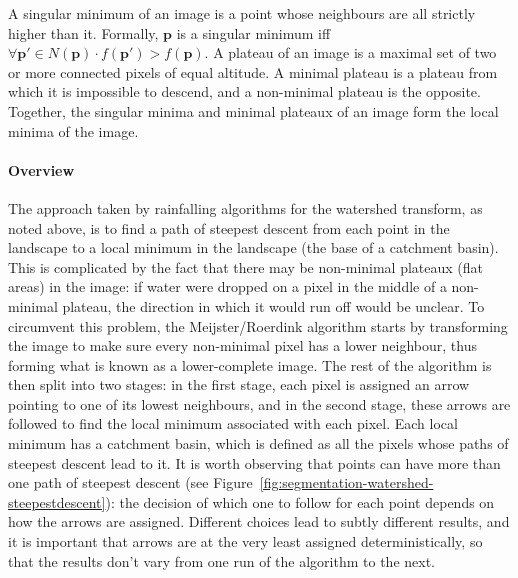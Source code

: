 
A singular minimum of an image is a point whose neighbours are all strictly higher than it. Formally, $\mathbf{p}$ is a singular minimum iff $\forall \mathbf{p'} \in N(\mathbf{p}) \cdot f(\mathbf{p'}) > f(\mathbf{p})$. A plateau of an image is a maximal set of two or more connected pixels of equal altitude. A minimal plateau is a plateau from which it is impossible to descend, and a non-minimal plateau is the opposite. Together, the singular minima and minimal plateaux of an image form the local minima of the image.

\paragraph{Overview} The approach taken by rainfalling algorithms for the watershed transform, as noted above, is to find a path of steepest descent from each point in the landscape to a local minimum in the landscape (the base of a catchment basin). This is complicated by the fact that there may be non-minimal plateaux (flat areas) in the image: if water were dropped on a pixel in the middle of a non-minimal plateau, the direction in which it would run off would be unclear. To circumvent this problem, the Meijster/Roerdink algorithm starts by transforming the image to make sure every non-minimal pixel has a lower neighbour, thus forming what is known as a lower-complete image. The rest of the algorithm is then split into two stages: in the first stage, each pixel is assigned an arrow pointing to one of its lowest neighbours, and in the second stage, these arrows are followed to find the local minimum associated with each pixel. Each local minimum has a catchment basin, which is defined as all the pixels whose paths of steepest descent lead to it. It is worth observing that points can have more than one path of steepest descent (see Figure~\ref{fig:segmentation-watershed-steepestdescent}): the decision of which one to follow for each point depends on how the arrows are assigned. Different choices lead to subtly different results, and it is important that arrows are at the very least assigned deterministically, so that the results don't vary from one run of the algorithm to the next.


